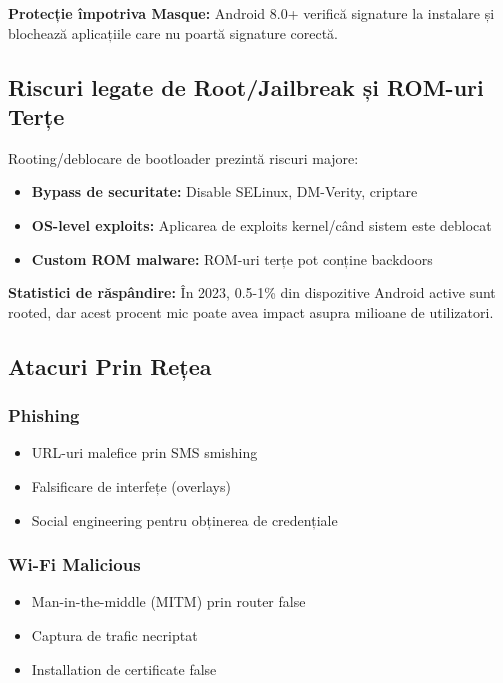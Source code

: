\documentclass[11pt,a4paper,twocolumn]{article}
\theoremstyle{definition}
\theoremstyle{plain}
\theoremstyle{remark}
\begin{document}
\textbf{Protecție împotriva Masque:} Android 8.0+ verifică signature la instalare și blochează 
aplicațiile care nu poartă signature corectă.

\subsection{Riscuri legate de Root/Jailbreak și ROM-uri Terțe}

Rooting/deblocare de bootloader prezintă riscuri majore:
\begin{itemize}
    \item \textbf{Bypass de securitate:} Disable SELinux, DM-Verity, criptare
    \item \textbf{OS-level exploits:} Aplicarea de exploits kernel/când sistem este deblocat
    \item \textbf{Custom ROM malware:} ROM-uri terțe pot conține backdoors
\end{itemize}

\textbf{Statistici de răspândire:} În 2023, 0.5-1\% din dispozitive Android active sunt rooted, 
dar acest procent mic poate avea impact asupra milioane de utilizatori.

\subsection{Atacuri Prin Rețea}

\subsubsection{Phishing}
\begin{itemize}
    \item URL-uri malefice prin SMS smishing
    \item Falsificare de interfețe (overlays)
    \item Social engineering pentru obținerea de credențiale
\end{itemize}

\subsubsection{Wi-Fi Malicious}
\begin{itemize}
    \item Man-in-the-middle (MITM) prin router false
    \item Captura de trafic necriptat
    \item Installation de certificate false
\end{itemize}
\end{document}
